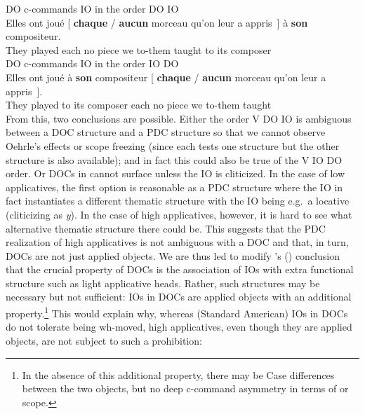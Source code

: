 \documentclass[output=paper]{langsci/langscibook}
\begin{document}
\ea \label{doio26}
\ea  DO c-commands IO in the order DO IO\\
\gll Elles {ont  jou\'{e}} [ {\bf chaque} / {\bf aucun} morceau qu'on leur {a
appris}~] \`{a} {\bf son} compositeur.\\
They played {} each {} no piece we to-them {} taught to its composer\\
\ex  DO c-commands IO in the order IO DO\\
\gll Elles  {ont jou\'{e}}  \`{a} {\bf son} compositeur [
\textbf{chaque} / \textbf{aucun} morceau qu'on leur {a appris}~].\\
They played to its composer {} each {} no piece we to-them taught \\
\z
\z
%
From this, two conclusions are possible. Either the order V DO IO is ambiguous
between a \gls{DOC} structure and a
\gls{PDC} structure so that we cannot
observe Oehrle's effects or scope freezing (since each tests one structure but
the other structure is also available); and in fact this could also be true of
the V IO DO order. Or \glspl{DOC} in
 cannot surface unless the IO is cliticized. In the case of low
applicatives, the first option is reasonable as a \gls{PDC} structure where the IO in fact instantiates a different
thematic structure with the IO being e.g.\ a locative (cliticizing as {\it y}).
In the case of high applicatives, however, it is hard to see what alternative
thematic structure there could be. This suggests that the
\gls{PDC} realization of high
applicatives is not ambiguous with a \gls{DOC}
and that, in turn, \glspl{DOC} are not just applied objects. We are thus led to
modify \citeauthor{anagnostopoulou2005cross}'s
(\citeyear{anagnostopoulou2005cross}) conclusion that the crucial  property of
\glspl{DOC} is  the association of \glspl{IO}
with extra functional structure such  as light applicative heads. Rather, such
structures may be necessary but not sufficient: \glspl{IO} in \glspl{DOC} are
applied objects with an additional property.\footnote{In the absence of this
    additional property, there may be Case differences between the two objects,
    but no deep c-command asymmetry in terms of  or scope.} This
    would explain why, whereas (Standard American)  \glspl{IO} in
    \glspl{DOC} do not tolerate being wh-moved, high applicatives, even though
    they are applied objects, are not subject to such a prohibition:
\end{document}
